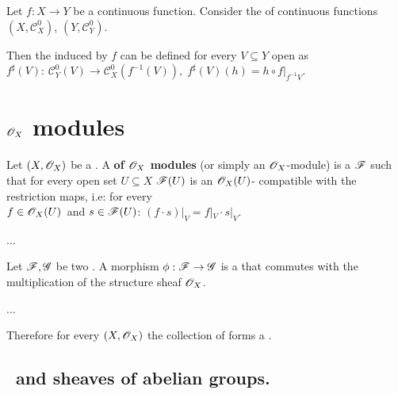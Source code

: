 \documentclass[../main.tex]{subfiles}
\begin{document}
\begin{example}
  Let \(f: X \to Y\) be a continuous function.
  Consider the  of continuous functions \((X, \mathcal{C}_{X}^{0})\), \((Y, \mathcal{C}_{Y}^{0})\).

  Then the  induced by \(f\) can be defined for every \(V \subseteq Y\) open as \(f^{\sharp}(V):\,\mathcal{C}_{Y}^{0}(V) \to \mathcal{C}_{X}^{0}(f^{-1}(V)),\; f^{\sharp}(V)(h) = h \circ f|_{f^{-1}V} \).
\end{example}

\section{\(\mathscr{O}_{X}\) modules}

\begin{definition} \label{def:ox-mod}
  Let  \((X, \mathscr{O}_{X})\) be a .
  A \textbf{ of \(\mathscr{O}_{X}\) modules} (or simply an \(\mathscr{O}_{X}\)-module) is a  \(\mathscr{F}\) such that for every open set \(U \subseteq X\) \(\mathscr{F}(U)\) is an \(\mathscr{O}_{X}(U)\)- compatible with the restriction maps, i.e: for every\\\(f \in \mathscr{O}_{X}(U)\)~and \(s \in \mathscr{F}(U)\): \(\left.\left( f \cdot s \right)\right|_{V} = f|_{V} \cdot s|_{V} \).
\end{definition}

\begin{example}
  ...
\end{example}

\begin{definition} \label{def:ox-mod-morphism}
  Let \(\mathscr{F}, \mathscr{G}\) be two .
  A morphism \(\phi: \mathscr{F} \to \mathscr{G}\) is a  that commutes with the multiplication of the structure sheaf \(\mathscr{O}_{X}\).
\end{definition}

\begin{example}
...
\end{example}

Therefore for every  \((X, \mathscr{O}_{X})\) the collection of  forms a  \oxmod.

\subsection{\oxmod\ and sheaves of abelian groups.} \label{sec:oxmod-and-sh-ab}
\end{document}
